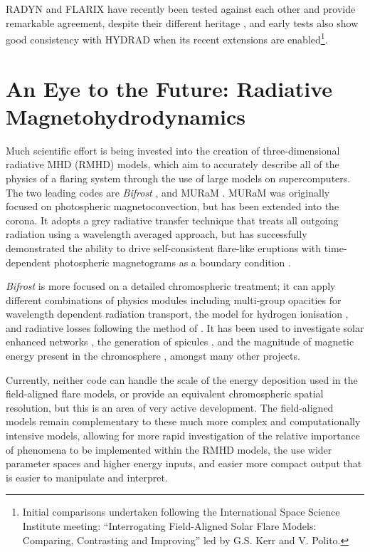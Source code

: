 RADYN and FLARIX have recently been tested against each other and provide remarkable agreement, despite their different heritage \citep{Kasparova2019}, and early tests also show good consistency with HYDRAD when its recent extensions are enabled\footnote{Initial comparisons undertaken following the International Space Science Institute meeting: ``Interrogating Field-Aligned Solar Flare Models: Comparing, Contrasting and Improving'' led by G.S. Kerr and V. Polito.}.

\section{An Eye to the Future: Radiative Magnetohydrodynamics}

Much scientific effort is being invested into the creation of three-dimensional radiative MHD (RMHD) models, which aim to accurately describe all of the physics of a flaring system through the use of large models on supercomputers. The two leading codes are \textit{Bifrost} \citep{Gudiksen2011}, and MURaM \citep{Rempel2009,Rempel2016}. MURaM was originally focused on photospheric magnetoconvection, but has been extended into the corona. It adopts a grey radiative transfer technique that treats all outgoing radiation using a wavelength averaged approach, but has successfully demonstrated the ability to drive self-consistent flare-like eruptions with time-dependent photospheric magnetograms as a boundary condition \citep{Cheung2019}.

\textit{Bifrost} is more focused on a detailed chromospheric treatment; it can apply different combinations of physics modules including multi-group opacities for wavelength dependent radiation transport, the \citet{Sollum1999} model for hydrogen ionisation \citep[following the treatment of][]{Leenaarts2007}, and radiative losses following the method of \citet{Carlsson2012}.
It has been used to investigate solar enhanced networks \citep{Carlsson2016}, the generation of spicules \citep{Martinez-Sykora2017}, and the magnitude of magnetic energy present in the chromosphere \citep{Martinez-Sykora2019}, amongst many other projects.

Currently, neither code can handle the scale of the energy deposition used in the field-aligned flare models, or provide an equivalent chromospheric spatial resolution, but this is an area of very active development.
The field-aligned models remain complementary to these much more complex and computationally intensive models, allowing for more rapid investigation of the relative importance of phenomena to be implemented within the RMHD models, the use wider parameter spaces and higher energy inputs, and easier more compact output that is easier to manipulate and interpret.


